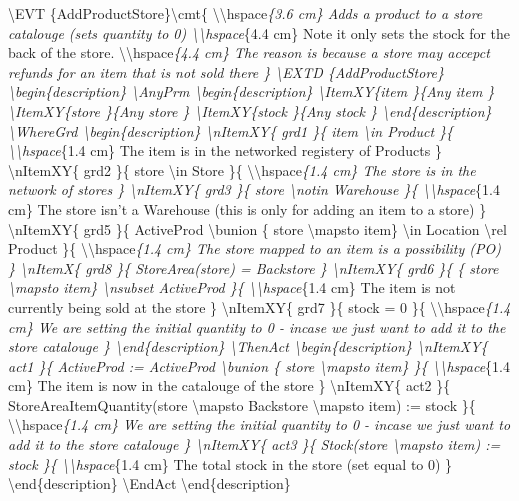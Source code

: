 \textbackslash{}EVT \{AddProductStore\}\textbackslash{}cmt\{ \textbackslash{}\textbackslash{}hspace\emph{\{3.6 cm\} Adds a product to a store catalouge (sets quantity to 0) \textbackslash{}\textbackslash{}hspace}\{4.4 cm\} Note it only sets the stock for the back of the store. \textbackslash{}\textbackslash{}hspace\emph{\{4.4 cm\} The reason is because a store may accepct refunds for an item that is not sold there \}
\textbackslash{}EXTD \{AddProductStore\}
\textbackslash{}begin\{description\}
\textbackslash{}AnyPrm
\textbackslash{}begin\{description\}
\textbackslash{}ItemXY\{item \}\{Any item \}
\textbackslash{}ItemXY\{store \}\{Any store \}
\textbackslash{}ItemXY\{stock \}\{Any stock \}
\textbackslash{}end\{description\}
\textbackslash{}WhereGrd
\textbackslash{}begin\{description\}
\textbackslash{}nItemXY\{ grd1 \}\{ item \textbackslash{}in Product \}\{ \textbackslash{}\textbackslash{}hspace}\{1.4 cm\} The item is in the networked registery of Products \}
\textbackslash{}nItemXY\{ grd2 \}\{ store \textbackslash{}in Store \}\{ \textbackslash{}\textbackslash{}hspace\emph{\{1.4 cm\} The store is in the network of stores \}
\textbackslash{}nItemXY\{ grd3 \}\{ store \textbackslash{}notin Warehouse \}\{ \textbackslash{}\textbackslash{}hspace}\{1.4 cm\} The store isn't a Warehouse (this is only for adding an item to a store) \}
\textbackslash{}nItemXY\{ grd5 \}\{ ActiveProd \textbackslash{}bunion \{ store \textbackslash{}mapsto item\} \textbackslash{}in Location \textbackslash{}rel Product \}\{ \textbackslash{}\textbackslash{}hspace\emph{\{1.4 cm\} The store mapped to an item is a possibility (PO) \}
\textbackslash{}nItemX\{ grd8 \}\{ StoreArea(store) = Backstore \}
\textbackslash{}nItemXY\{ grd6 \}\{ \{ store \textbackslash{}mapsto item\} \textbackslash{}nsubset ActiveProd \}\{ \textbackslash{}\textbackslash{}hspace}\{1.4 cm\} The item is not currently being sold at the store \}
\textbackslash{}nItemXY\{ grd7 \}\{ stock = 0 \}\{ \textbackslash{}\textbackslash{}hspace\emph{\{1.4 cm\} We are setting the initial quantity to 0 - incase we just want to add it to the store catalouge \}
\textbackslash{}end\{description\}
\textbackslash{}ThenAct
\textbackslash{}begin\{description\}
\textbackslash{}nItemXY\{ act1 \}\{ ActiveProd := ActiveProd \textbackslash{}bunion \{ store \textbackslash{}mapsto item\} \}\{ \textbackslash{}\textbackslash{}hspace}\{1.4 cm\} The item is now in the catalouge of the store \}
\textbackslash{}nItemXY\{ act2 \}\{ StoreAreaItemQuantity(store \textbackslash{}mapsto Backstore \textbackslash{}mapsto item) := stock \}\{ \textbackslash{}\textbackslash{}hspace\emph{\{1.4 cm\} We are setting the initial quantity to 0 - incase we just want to add it to the store catalouge \}
\textbackslash{}nItemXY\{ act3 \}\{ Stock(store \textbackslash{}mapsto item) := stock \}\{ \textbackslash{}\textbackslash{}hspace}\{1.4 cm\} The total stock in the store (set equal to 0) \}
\textbackslash{}end\{description\}
\textbackslash{}EndAct
\textbackslash{}end\{description\}




